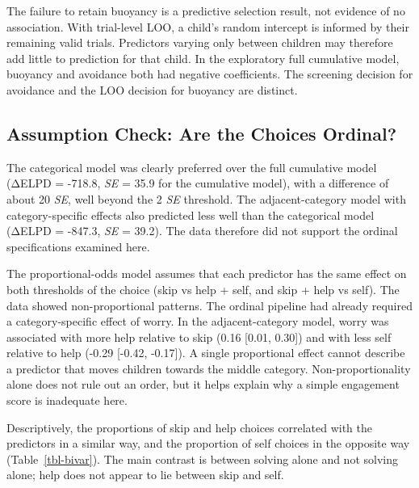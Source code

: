 \documentclass[
  man,
  floatsintext,
  longtable,
  nolmodern,
  notxfonts,
  notimes,
  colorlinks=true,linkcolor=blue,citecolor=blue,urlcolor=blue]{apa7}
\begin{document}
The failure to retain buoyancy is a predictive selection result, not
evidence of no association. With trial-level LOO, a child's random
intercept is informed by their remaining valid trials. Predictors
varying only between children may therefore add little to prediction for
that child. In the exploratory full cumulative model, buoyancy and
avoidance both had negative coefficients. The screening decision for
avoidance and the LOO decision for buoyancy are distinct.

\subsection{Assumption Check: Are the Choices
Ordinal?}\label{assumption-check-are-the-choices-ordinal}

The categorical model was clearly preferred over the full cumulative
model (ΔELPD = -718.8, \emph{SE} = 35.9 for the cumulative model), with
a difference of about 20 \emph{SE}, well beyond the 2 \emph{SE}
threshold. The adjacent-category model with category-specific effects
also predicted less well than the categorical model (ΔELPD = -847.3,
\emph{SE} = 39.2). The data therefore did not support the ordinal
specifications examined here.

The proportional-odds model assumes that each predictor has the same
effect on both thresholds of the choice (skip vs help + self, and skip +
help vs self). The data showed non-proportional patterns. The ordinal
pipeline had already required a category-specific effect of worry. In
the adjacent-category model, worry was associated with more help
relative to skip (0.16 {[}0.01, 0.30{]}) and with less self relative to
help (-0.29 {[}-0.42, -0.17{]}). A single proportional effect cannot
describe a predictor that moves children towards the middle category.
Non-proportionality alone does not rule out an order, but it helps
explain why a simple engagement score is inadequate here.

Descriptively, the proportions of skip and help choices correlated with
the predictors in a similar way, and the proportion of self choices in
the opposite way (Table~\ref{tbl-bivar}). The main contrast is between
solving alone and not solving alone; help does not appear to lie between
skip and self.
\end{document}
